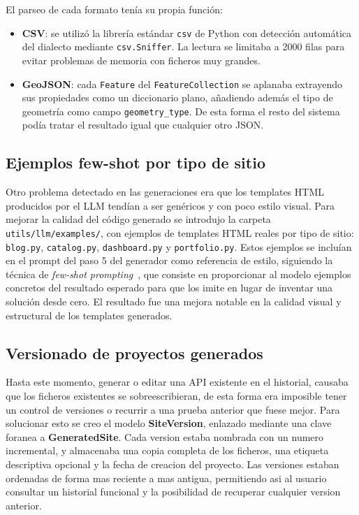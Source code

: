 El parseo de cada formato tenía su propia función:

\begin{itemize}
    \item \textbf{CSV}: se utilizó la librería estándar \texttt{csv} de Python con detección automática del dialecto mediante \texttt{csv.Sniffer}. La lectura se limitaba a 2000 filas para evitar problemas de memoria con ficheros muy grandes.
    \item \textbf{GeoJSON}: cada \texttt{Feature} del \texttt{FeatureCollection} se aplanaba extrayendo sus propiedades como un diccionario plano, añadiendo además el tipo de geometría como campo \texttt{geometry\_type}. De esta forma el resto del sistema podía tratar el resultado igual que cualquier otro JSON.
\end{itemize}

\subsection{Ejemplos few-shot por tipo de sitio}
\label{subsec:ejemplos-fewshot}

Otro problema detectado en las generaciones era que los templates HTML producidos por el LLM tendían a ser genéricos y con poco estilo visual. Para mejorar la calidad del código generado se introdujo la carpeta \texttt{utils/llm/examples/}, con ejemplos de templates HTML reales por tipo de sitio: \texttt{blog.py}, \texttt{catalog.py}, \texttt{dashboard.py} y \texttt{portfolio.py}. Estos ejemplos se incluían en el prompt del paso 5 del generador como referencia de estilo, siguiendo la técnica de \emph{few-shot prompting}~\cite{openai_prompt_engineering}, que consiste en proporcionar al modelo ejemplos concretos del resultado esperado para que los imite en lugar de inventar una solución desde cero. El resultado fue una mejora notable en la calidad visual y estructural de los templates generados.


\subsection{Versionado de proyectos generados}
\label{subsec:versionado-paginas}

Hasta este momento, generar o editar una API existente en el historial, causaba que los ficheros existentes se sobreescribieran, de esta forma era imposible tener un control de versiones o recurrir a una prueba anterior que fuese mejor. Para solucionar esto se creo el modelo \textbf{SiteVersion}, enlazado mediante una clave foranea a \textbf{GeneratedSite}. Cada version estaba nombrada con un numero incremental, y almacenaba una copia completa de los ficheros, una etiqueta descriptiva opcional y la fecha de creacion del proyecto. Las versiones estaban ordenadas de forma mas reciente a mas antigua, permitiendo asi al usuario consultar un historial funcional y la posibilidad de recuperar cualquier version anterior.

